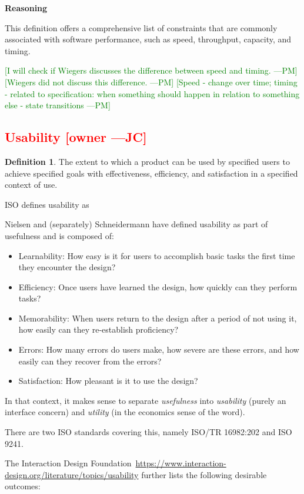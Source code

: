 \documentclass[letterpaper,cleveref]{lipics-v2019}
\newcommand{\authornote}[3]{\textcolor{#1}{[#3 ---#2]}}
\newcommand{\authornote}[3]{}
\newcommand{\jc}[1]{\authornote{red}{JC}{#1}} %
\newcommand{\pmi}[1]{\authornote{green}{PM}{#1}} %
\newcommand{\notdone}[1]{\textcolor{red}{#1}}
\theoremstyle{definition}
\newtheorem{defn}{Definition}
\begin{document}
\noindent \textbf{Reasoning}

This definition offers a comprehensive list of constraints that are commonly
associated with software performance, such as speed, throughput, capacity, and
timing.

\pmi{I will check if Wiegers discusses the difference between speed and timing.}
\pmi{Wiegers did not discuss this difference.}
\pmi{Speed - change over time; timing - related to specification: when something
	should happen in relation to something else - state transitions}

\subsection{\notdone{Usability} \jc{owner}} 

\begin{defn}
	The extent to which a product can be used by specified users to achieve
	specified goals with effectiveness, efficiency, and satisfaction in a specified
	context of use.
\end{defn}
ISO defines usability as

Nielsen and (separately) Schneidermann have defined usability as part of
usefulness and
is composed of:
\begin{itemize}
	\item Learnability: How easy is it for users to accomplish basic tasks the
	first time they encounter the design?
	\item Efficiency: Once users have learned the design, how quickly can they
	perform tasks?
	\item Memorability: When users return to the design after a period of not using
	it, how easily can they re-establish proficiency?
	\item Errors: How many errors do users make, how severe are these errors, and
	how easily can they recover from the errors?
	\item Satisfaction: How pleasant is it to use the design?
\end{itemize}
In that context, it makes sense to separate \emph{usefulness} into
\emph{usability} (purely an interface concern) and \emph{utility} (in the
economics
sense of the word).

There are two ISO standards covering this, namely ISO/TR 16982:202 and ISO 9241.


The Interaction Design
Foundation~\url{https://www.interaction-design.org/literature/topics/usability}
further lists the following desirable outcomes:
\end{document}
